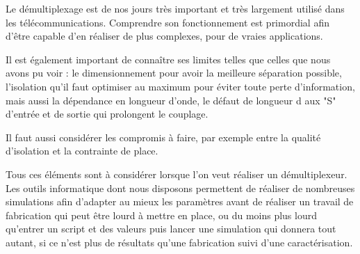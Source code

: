 \documentclass[a4paper,11pt]{report}
\begin{document}
Le démultiplexage est de nos jours très important et très largement utilisé dans les télécommunications. Comprendre son fonctionnement est primordial afin d'être capable d'en réaliser de plus complexes, pour de vraies applications.

Il est également important de connaître ses limites telles que celles que nous avons pu voir : le dimensionnement pour avoir la meilleure séparation possible, l'isolation qu'il faut optimiser au maximum pour éviter toute perte d'information, mais aussi la dépendance en longueur d'onde, le défaut de longueur d aux "S" d'entrée et de sortie qui prolongent le couplage.

Il faut aussi considérer les compromis à faire, par exemple entre la qualité d'isolation et la contrainte de place.

Tous ces éléments sont à considérer lorsque l'on veut réaliser un démultiplexeur. Les outils informatique dont nous disposons permettent de réaliser de nombreuses simulations afin d'adapter au mieux les paramètres avant de réaliser un travail de fabrication qui peut être lourd à mettre en place, ou du moins plus lourd qu'entrer un script et des valeurs puis lancer une simulation qui donnera tout autant, si ce n'est plus de résultats qu'une fabrication suivi d'une caractérisation. 

\nocite{*}


\end{document}
